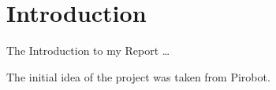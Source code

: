 \chapter{Introduction} \label{Chapter:Introduction}
The Introduction to my Report \dots

The initial idea of the project was taken from Pirobot\cite{Pirobot}.
